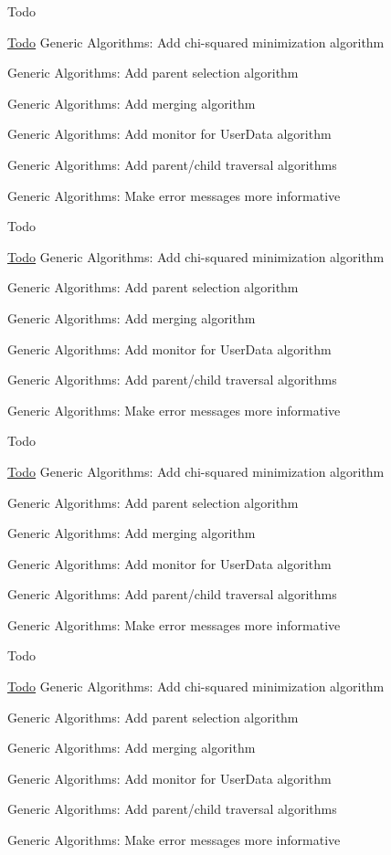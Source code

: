 \begin{DoxyRefDesc}{Todo}
\item[\hyperlink{todo__todo000009}{Todo}]Generic Algorithms\+: Add chi-\/squared minimization algorithm 

Generic Algorithms\+: Add parent selection algorithm 

Generic Algorithms\+: Add merging algorithm 

Generic Algorithms\+: Add monitor for User\+Data algorithm 

Generic Algorithms\+: Add parent/child traversal algorithms 

Generic Algorithms\+: Make error messages more informative \end{DoxyRefDesc}


\begin{DoxyRefDesc}{Todo}
\item[\hyperlink{todo__todo000010}{Todo}]Generic Algorithms\+: Add chi-\/squared minimization algorithm 

Generic Algorithms\+: Add parent selection algorithm 

Generic Algorithms\+: Add merging algorithm 

Generic Algorithms\+: Add monitor for User\+Data algorithm 

Generic Algorithms\+: Add parent/child traversal algorithms 

Generic Algorithms\+: Make error messages more informative \end{DoxyRefDesc}


\begin{DoxyRefDesc}{Todo}
\item[\hyperlink{todo__todo000011}{Todo}]Generic Algorithms\+: Add chi-\/squared minimization algorithm 

Generic Algorithms\+: Add parent selection algorithm 

Generic Algorithms\+: Add merging algorithm 

Generic Algorithms\+: Add monitor for User\+Data algorithm 

Generic Algorithms\+: Add parent/child traversal algorithms 

Generic Algorithms\+: Make error messages more informative \end{DoxyRefDesc}


\begin{DoxyRefDesc}{Todo}
\item[\hyperlink{todo__todo000012}{Todo}]Generic Algorithms\+: Add chi-\/squared minimization algorithm 

Generic Algorithms\+: Add parent selection algorithm 

Generic Algorithms\+: Add merging algorithm 

Generic Algorithms\+: Add monitor for User\+Data algorithm 

Generic Algorithms\+: Add parent/child traversal algorithms 

Generic Algorithms\+: Make error messages more informative \end{DoxyRefDesc}


